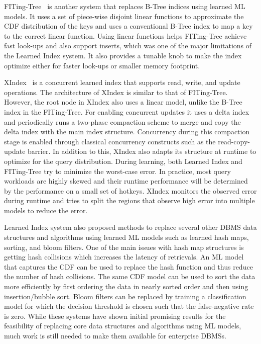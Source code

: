 FITing-Tree~\cite{fitingtree} is another system that replaces B-Tree indices using learned ML models.
It uses a set of piece-wise disjoint linear functions to approximate the CDF distribution of the keys and uses a conventional B-Tree index to map a key to the correct linear function.
Using linear functions helps FITing-Tree achieve fast look-ups and also support inserts, which was one of the major limitations of the Learned Index system.
It also provides a tunable knob to make the index optimize either for faster look-ups or smaller memory footprint.

XIndex~\cite{xindex} is a concurrent learned index that supports read, write, and update operations.
The architecture of XIndex is similar to that of FITing-Tree.
However, the root node in XIndex also uses a linear model, unlike the B-Tree index in the FITing-Tree.
For enabling concurrent updates it uses a delta index and periodically runs a two-phase compaction scheme to merge and copy the delta index with the main index structure.
Concurrency during this compaction stage is enabled through classical concurrency constructs such as the read-copy-update barrier.
In addition to this, XIndex also adapts its structure at runtime to optimize for the query distribution.
During learning, both Learned Index and FITing-Tree try to minimize the worst-case error.
In practice, most query workloads are highly skewed and their runtime performance will be determined by the performance on a small set of hotkeys.
XIndex monitors the observed error during runtime and tries to split the regions that observe high error into multiple models to reduce the error.

Learned Index system also proposed methods to replace several other DBMS data structures and algorithms using learned ML models such as learned hash maps, sorting, and bloom filters.
One of the main issues with hash map structures is getting hash collisions which increases the latency of retrievals.
An ML model that captures the CDF can be used to replace the hash function and thus reduce the number of hash collisions.
The same CDF model can be used to sort the data more efficiently by first ordering the data in nearly sorted order and then using insertion/bubble sort.
Bloom filters can be replaced by training a classification model for which the decision threshold is chosen such that the false-negative rate is zero.
While these systems have shown initial promising results for the feasibility of replacing core data structures and algorithms using ML models, much work is still needed to make them available for enterprise DBMSs.